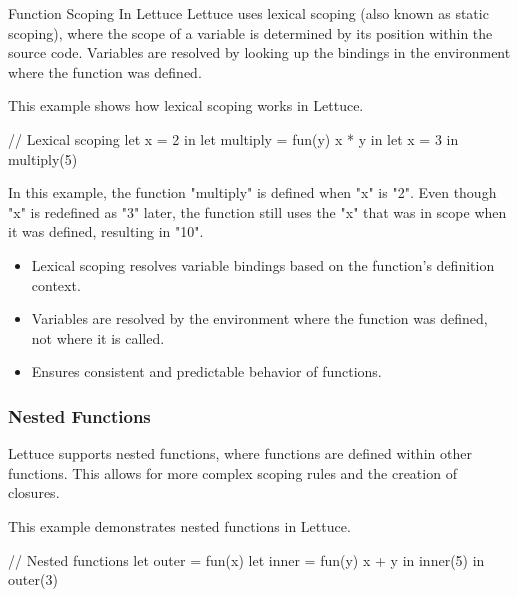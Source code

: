 \begin{notes}{Function Scoping In Lettuce}
    Lettuce uses lexical scoping (also known as static scoping), where the scope of a variable is determined by its position within the source code. Variables are resolved by looking up the bindings 
    in the environment where the function was defined.
    
    \begin{highlight}
    
        This example shows how lexical scoping works in Lettuce.
    
    \begin{code}[Lettuce]
    // Lexical scoping
    let x = 2 in
    let multiply = fun(y) {
        x * y
    } in
    let x = 3 in
    multiply(5)
    \end{code}
    
        In this example, the function "multiply" is defined when "x" is "2". Even though "x" is redefined as "3" later, the function still uses the "x" that was in scope when it was defined, resulting in "10".
    
        \begin{itemize}
            \item Lexical scoping resolves variable bindings based on the function's definition context.
            \item Variables are resolved by the environment where the function was defined, not where it is called.
            \item Ensures consistent and predictable behavior of functions.
        \end{itemize}
    
    \end{highlight}
    
    \subsubsection*{Nested Functions}
    
    Lettuce supports nested functions, where functions are defined within other functions. This allows for more complex scoping rules and the creation of closures.
    
    \begin{highlight}
    
        This example demonstrates nested functions in Lettuce.
    
    \begin{code}[Lettuce]
    // Nested functions
    let outer = fun(x) {
        let inner = fun(y) {
            x + y
        } in
        inner(5)
    } in
    outer(3)
    \end{code}
    

\end{highlight}
\end{notes}
